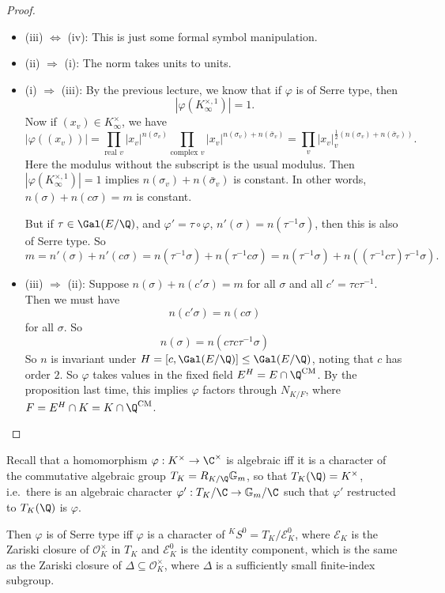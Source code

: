 \documentclass[a4paper]{article}
\renewcommand\G{\mathbb{G}}
\newcommand\CM{\mathrm{CM}}
\begin{document}
\begin{proof}\leavevmode
  \begin{itemize}
    \item (iii) $\Leftrightarrow$ (iv): This is just some formal symbol manipulation.
    \item (ii) $\Rightarrow$ (i): The norm takes units to units.
    \item (i) $\Rightarrow$ (iii): By the previous lecture, we know that if $\varphi$ is of Serre type, then
      \[
        |\varphi(K_\infty^{\times, 1})| = 1.
      \]
      Now if $(x_v) \in K_\infty^\times$, we have
      \[
        |\varphi((x_v))| = \prod_{\text{real }v} |x_v|^{n(\sigma_v)} \prod_{\text{complex }v} |x_v|^{n(\sigma_v) + n(\bar{\sigma}_v)} = \prod_v |x_v|_v^{\frac{1}{2} (n(\sigma_v) + n(\bar{\sigma}_v))}.
      \]
      Here the modulus without the subscript is the usual modulus. Then $|\varphi(K_\infty^{\times, 1})| = 1$ implies $n(\sigma_v) + n(\bar{\sigma}_v)$ is constant. In other words, $n(\sigma) + n(c\sigma) = m$ is constant.
      
      But if $\tau \in \Gal(E/\Q)$, and $\varphi' = \tau \circ \varphi$, $n'(\sigma) = n(\tau^{-1}\sigma)$, then this is also of Serre type. So
      \[
        m = n'(\sigma) + n'(c\sigma) = n(\tau^{-1} \sigma) + n(\tau^{-1} c \sigma) = n(\tau^{-1} \sigma) + n((\tau^{-1} c \tau) \tau^{-1} \sigma).
      \]
    \item (iii) $\Rightarrow$ (ii): Suppose $n(\sigma) + n(c'\sigma) = m$ for all $\sigma$ and all $c' = \tau c \tau^{-1}$. Then we must have
      \[
        n(c'\sigma) = n(c\sigma)
      \]
      for all $\sigma$. So
      \[
        n(\sigma) = n(c\tau c \tau^{-1} \sigma)
      \]
      So $n$ is invariant under $H = [c, \Gal(E/\Q)] \leq \Gal(E/\Q)$, noting that $c$ has order $2$. So $\varphi$ takes values in the fixed field $E^H = E \cap \Q^{\CM}$. By the proposition last time, this implies $\varphi$ factors through $N_{K/F}$, where  $F = E^H \cap K = K \cap \Q^{\CM}$.
  \end{itemize}
\end{proof}
Recall that a homomorphism $\varphi: K^\times \to \C^\times$ is algebraic iff it is a character of the commutative algebraic group $T_K = R_{K/\Q} \G_m$, so that $T_K(\Q) = K^\times$, i.e.\ there is an algebraic character $\varphi': T_K/\C \to \G_m/\C$ such that $\varphi'$ restructed to $T_K(\Q)$ is $\varphi$.

Then $\varphi$ is of Serre type iff $\varphi$ is a character of $^KS^0 = T_K/\mathcal{E}_K^0$, where $\mathcal{E}_K$ is the Zariski closure of $\mathcal{O}_K^\times$ in $T_K$ and $\mathcal{E}_K^0$ is the identity component, which is the same as the Zariski closure of $\Delta \subseteq \mathcal{O}_K^\times$, where $\Delta$ is a sufficiently small finite-index subgroup.
\end{document}

